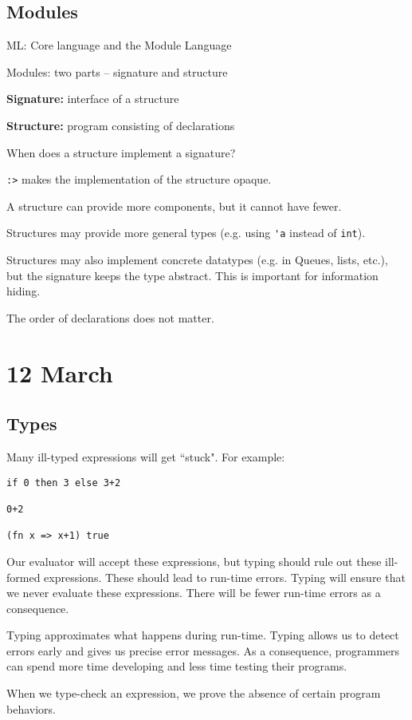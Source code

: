 \documentclass[11pt]{article}
\begin{document}
\subsection{Modules}
ML: Core language and the Module Language

Modules: two parts --  signature and structure

\textbf{Signature:} interface of a structure

\textbf{Structure:} program consisting of declarations

When does a structure implement a signature?

\verb~:>~ makes the implementation of the structure opaque. 

A structure can provide more components, but it cannot have fewer. 

Structures may provide more general types (e.g. using \verb~'a~ instead of \verb~int~).

Structures may also implement concrete datatypes (e.g. in Queues, lists, etc.), but the signature keeps the type abstract. This is important for information hiding.

The order of declarations does not matter.


\section{12 March}
\subsection{Types}

Many ill-typed expressions will get ``stuck". For example:
\begin{verbatim}
if 0 then 3 else 3+2

0+2

(fn x => x+1) true
\end{verbatim}

Our evaluator will accept these expressions, but typing should rule out these ill-formed expressions. These should lead to run-time errors. Typing will ensure that we never evaluate these expressions. There will be fewer run-time errors as a consequence.

Typing approximates what happens during run-time. Typing allows us to detect errors early and gives us precise error messages. As a consequence, programmers can spend more time developing and less time testing their programs. 

When we type-check an expression, we prove the absence of certain program behaviors.
\end{document}
